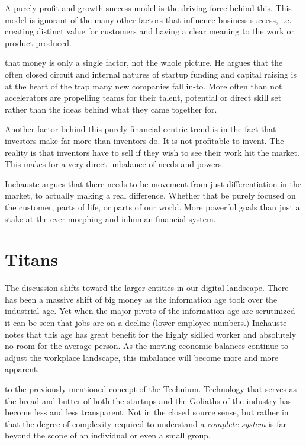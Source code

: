 A purely profit and growth success model is the driving force behind this. This model is ignorant of the many other factors that influence business success, i.e. creating distinct value for customers and having a clear meaning to the work or product produced.

 that money is only a single factor, not the whole picture. He argues that the often closed circuit and internal natures of startup funding and capital raising is at the heart of the trap many new companies fall in-to. More often than not accelerators are propelling teams for their talent, potential or direct skill set rather than the ideas behind what they came together for.

Another factor behind this purely financial centric trend is in the fact that investors make far more than inventors do. It is not profitable to invent. The reality is that inventors have to sell if they wish to see their work hit the market. This makes for a very direct imbalance of needs and powers.

Inchauste argues that there needs to be movement from just differentiation in the market, to actually making a real difference. Whether that be purely focused on the customer, parts of life, or parts of our world. More powerful goals than just a stake at the ever morphing and inhuman financial system.

\section{Titans}

The discussion shifts toward the larger entities in our digital landscape. There has been a massive shift of big money as the information age took over the industrial age. Yet when the major pivots of the information age are scrutinized it can be seen that jobs are on a decline (lower employee numbers.) Inchauste notes that this age has great benefit for the highly skilled worker and absolutely no room for the average person. As the moving economic balances continue to adjust the workplace landscape, this imbalance will become more and more apparent. 

 to the previously mentioned concept of the Technium. Technology that serves as the bread and butter of both the startups and the Goliaths of the industry has become less and less transparent. Not in the closed source sense, but rather in that the degree of complexity required to understand a \textit{complete system} is far beyond the scope of an individual or even a small group.

